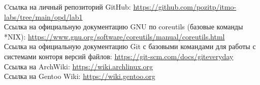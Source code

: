 \begin{thebibliography}{}
     Cсылка на личный репозиторий GitHub: \url{https://github.com/pozitp/itmo-labs/tree/main/opd/lab1}\\
     Ссылка на официальную документацию GNU по coreutils (базовые команды *NIX): \url{https://www.gnu.org/software/coreutils/manual/coreutils.html}\\
     Ссылка на официальную документацию Git с базовыми командами для работы с системами конторя версий файлов: \url{https://git-scm.com/docs/giteveryday}\\
     Ссылка на ArchWiki: \url{https://wiki.archlinux.org}\\
     Ссылка на Gentoo Wiki: \url{https://wiki.gentoo.org}\\

\end{thebibliography}